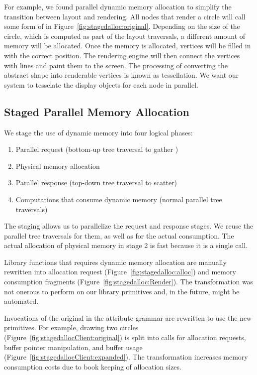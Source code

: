 For example, we found parallel dynamic memory allocation to simplify the transition between layout and rendering. All nodes that render a circle will call some form of  in Figure~\ref{fig:stagedalloc:original}. Depending on the size of the circle, which is computed as part of the layout traversals, a different amount of memory will be allocated. Once the memory is allocated, vertices will be filled in with the correct position. The rendering engine will then connect the vertices with lines and paint them to the screen. The processing of converting the abstract shape into renderable vertices is known as tessellation. We want our system to tesselate the display objects for each node in parallel.

\subsection{Staged Parallel Memory Allocation}
We stage the use of dynamic memory into four logical phases: 
\begin{enumerate}
\item Parallel request (bottom-up tree traversal to gather )
\item Physical memory allocation
\item Parallel response (top-down tree traversal to scatter)
\item Computations that consume dynamic memory (normal parallel tree traversals)
\end{enumerate}
 The staging allows us to parallelize the request and response stages. We reuse the parallel tree traversals for them, as well as for the actual consumption. The actual allocation of physical memory in stage 2 is fast because it is a single call. 

Library functions that requires dynamic memory allocation are manually rewritten into allocation request  (Figure~\ref{fig:stagedalloc:alloc}) and memory consumption fragments (Figure~\ref{fig:stagedalloc:Render}). The transformation was not onerous to perform on our library primitives and, in the future, might be automated. 

Invocations of the original in the attribute grammar are rewritten to use the new primitives. For example, drawing two circles (Figure~\ref{fig:stagedallocClient:original}) is split into calls for allocation requests, buffer pointer manipulation, and buffer usage (Figure~\ref{fig:stagedallocClient:expanded}). The transformation increases memory consumption costs due to book keeping of allocation sizes. 

